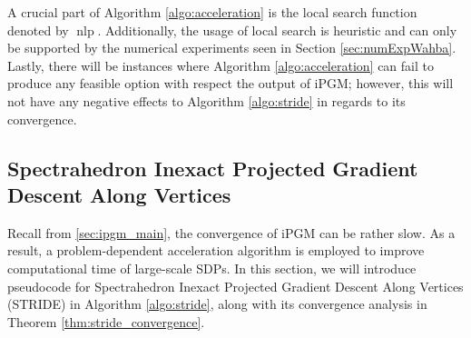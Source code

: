 \documentclass[12pt]{l4dc2021}
\DeclareMathOperator{\nlp}{nlp}
\begin{document}
    A crucial part of Algorithm \ref{algo:acceleration} is the local search function denoted by $\nlp$. Additionally, the usage of local search is heuristic and can only be supported by the numerical experiments seen in Section \ref{sec:numExpWahba}. Lastly, there will be instances where Algorithm \ref{algo:acceleration} can fail to produce any feasible option with respect the output of iPGM; however, this will not have any negative effects to Algorithm \ref{algo:stride} in regards to its convergence.

    \subsection{Spectrahedron Inexact Projected Gradient Descent Along Vertices}

    Recall from \ref{sec:ipgm_main}, the convergence of iPGM can be rather slow. As a result, a problem-dependent acceleration algorithm is employed to improve computational time of large-scale SDPs. In this section, we will introduce pseudocode for Spectrahedron Inexact Projected Gradient Descent Along Vertices (STRIDE) in Algorithm \ref{algo:stride}, along with its convergence analysis in Theorem \ref{thm:stride_convergence}.
\end{document}
